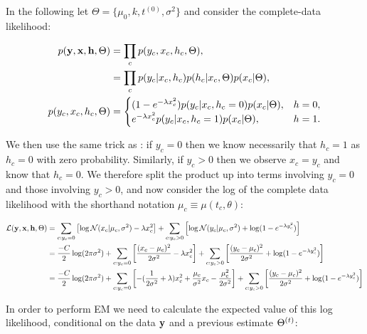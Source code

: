 In the following let $\Theta = \{\mu_0, k, t^{(0)}, \sigma^2\}$ and consider the complete-data likelihood:

\begin{equation}
	\begin{aligned}
p({\bf y}, {\bf x}, {\bf h}, \Theta) & = \prod_c p(y_c, x_c, h_c, \Theta), \\
& = \prod_c p(y_c | x_c, h_c) p(h_c | x_c, \Theta) p(x_c | \Theta), \\
	p(y_c, x_c, h_c, \Theta) & =
	\begin{cases}
		 (1 - e^{-\lambda x_c^2}) p(y_c | x_c, h_c = 0)  p(x_c | \Theta), & h = 0, \\
		 e^{-\lambda x_c^2} p(y_c | x_c, h_c = 1)  p(x_c | \Theta) , & h = 1. \\
	 \end{cases}
\end{aligned}
\end{equation}


We then use the same trick as \cite{pierson2015zifa}: if $y_c = 0$ then we know necessarily that $h_c = 1$ as $h_c = 0$ with zero probability. Similarly, if $y_c > 0$ then we observe $x_c = y_c$ and know that $h_c = 0$. We therefore split the product up into terms involving $y_c = 0$ and those involving $y_c > 0$, and now consider the log of the complete data likelihood with the shorthand notation $\mu_c \equiv \mu(t_c, \theta)$:

\begin{equation} \label{eq:lcl}
\begin{aligned}
\mathcal{L}({\bf y}, {\bf x}, {\bf h}, \Theta) & = \sum_{c: y_c = 0} \left[ \log \mathcal{N}(x_c | \mu_c, \sigma^2) - \lambda x_c^2 \right] + \sum_{c: y_c > 0} \left[ \log \mathcal{N}(y_c | \mu_c, \sigma^2) + \log(1 - e^{-\lambda y_c^2}) \right] \\
& = \frac{-C}{2} \log(2 \pi \sigma^2) +
\sum_{c: y_c = 0} \left[ \frac{(x_c - \mu_c)^2}{2 \sigma^2} - \lambda x_c^2 \right] +
\sum_{c: y_c > 0} \left[ \frac{(y_c - \mu_c)^2}{2 \sigma^2} + \log(1 - e^{-\lambda y_c^2}) \right] \\
& = \frac{-C}{2} \log(2 \pi \sigma^2) +
\sum_{c: y_c = 0} \left[ -(\frac{1}{2\sigma^2} + \lambda) x_c^2 + \frac{\mu_c}{\sigma^2} x_c - \frac{\mu_c^2}{2\sigma^2}\right] +
\sum_{c: y_c > 0} \left[ \frac{(y_c - \mu_c)^2}{2 \sigma^2} + \log(1 - e^{-\lambda y_c^2}) \right]
\end{aligned}
\end{equation}

In order to perform EM we need to calculate the expected value of this log likelihood, conditional on the data ${\bf y}$ and a previous estimate $\Theta^{(t)}$:


